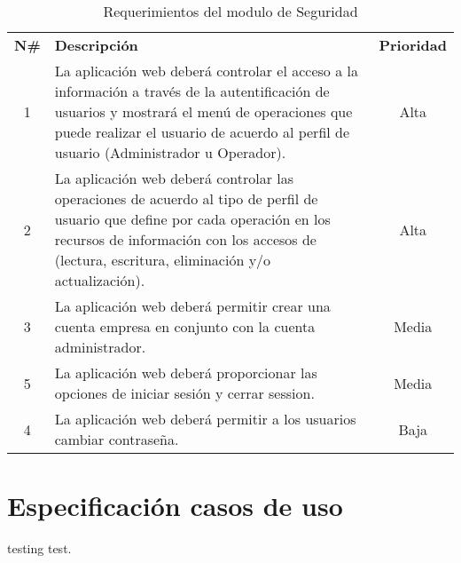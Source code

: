 \begin{table}[H]
	\centering
    \begin{tabular}{ |c|p{10cm}|c| }
	  \hline
	  \rowcolor{indigo-dark} \multicolumn{3}{|c|}{ \textcolor{white}{\textbf{Administración de Seguridad}}} \\
	  \hline
	  \rowcolor{indigo-light} \textbf{N\#} & \centering \textbf{Descripción} & \textbf{Prioridad} \\
	  \hline
	  1 & La aplicación web deberá controlar el acceso a la información a través de la autentificación de usuarios y mostrará el menú de operaciones que puede realizar el usuario de acuerdo al perfil de usuario (Administrador u Operador). & Alta\\
	  \hline
	  2 & La aplicación web deberá controlar las operaciones de acuerdo al tipo de perfil  de usuario que define por cada operación en los recursos de información con los accesos de (lectura, escritura, eliminación y/o actualización). & Alta\\
	  \hline
	  3 & La aplicación web deberá permitir crear una cuenta empresa en conjunto con la cuenta administrador. & Media \\
	  \hline
	  5 & La aplicación web deberá proporcionar las opciones de iniciar sesión y cerrar session. &  Media\\
	  \hline
	  4 & La aplicación web deberá permitir a los usuarios cambiar contraseña. &  Baja \\
	  \hline
	\end{tabular}
	\caption{Requerimientos del modulo de Seguridad}
\end{table}

\section{Especificación casos de uso}
\noindent testing test.
